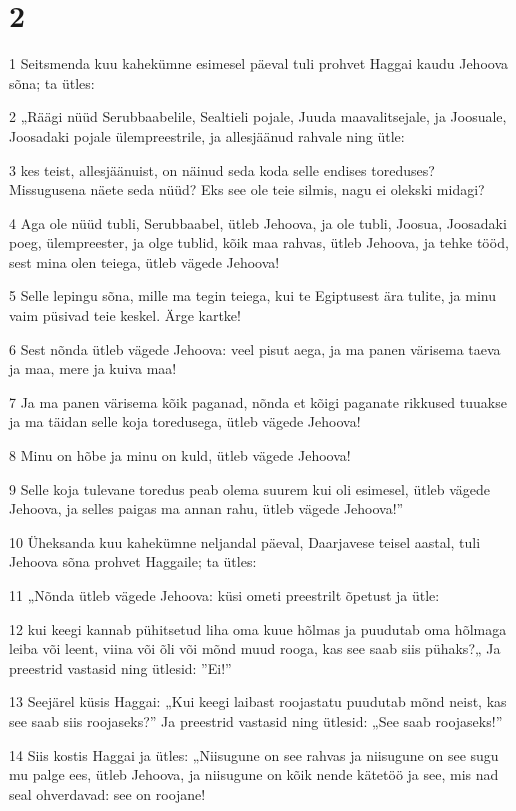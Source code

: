 \chapter{2}

\par 1 Seitsmenda kuu kahekümne esimesel päeval tuli prohvet Haggai kaudu Jehoova sõna; ta ütles:
\par 2 „Räägi nüüd Serubbaabelile, Sealtieli pojale, Juuda maavalitsejale, ja Joosuale, Joosadaki pojale ülempreestrile, ja allesjäänud rahvale ning ütle:
\par 3 kes teist, allesjäänuist, on näinud seda koda selle endises toreduses? Missugusena näete seda nüüd? Eks see ole teie silmis, nagu ei olekski midagi?
\par 4 Aga ole nüüd tubli, Serubbaabel, ütleb Jehoova, ja ole tubli, Joosua, Joosadaki poeg, ülempreester, ja olge tublid, kõik maa rahvas, ütleb Jehoova, ja tehke tööd, sest mina olen teiega, ütleb vägede Jehoova!
\par 5 Selle lepingu sõna, mille ma tegin teiega, kui te Egiptusest ära tulite, ja minu vaim püsivad teie keskel. Ärge kartke!
\par 6 Sest nõnda ütleb vägede Jehoova: veel pisut aega, ja ma panen värisema taeva ja maa, mere ja kuiva maa!
\par 7 Ja ma panen värisema kõik paganad, nõnda et kõigi paganate rikkused tuuakse ja ma täidan selle koja toredusega, ütleb vägede Jehoova!
\par 8 Minu on hõbe ja minu on kuld, ütleb vägede Jehoova!
\par 9 Selle koja tulevane toredus peab olema suurem kui oli esimesel, ütleb vägede Jehoova, ja selles paigas ma annan rahu, ütleb vägede Jehoova!”
\par 10 Üheksanda kuu kahekümne neljandal päeval, Daarjavese teisel aastal, tuli Jehoova sõna prohvet Haggaile; ta ütles:
\par 11 „Nõnda ütleb vägede Jehoova: küsi ometi preestrilt õpetust ja ütle:
\par 12 kui keegi kannab pühitsetud liha oma kuue hõlmas ja puudutab oma hõlmaga leiba või leent, viina või õli või mõnd muud rooga, kas see saab siis pühaks?„ Ja preestrid vastasid ning ütlesid: ”Ei!”
\par 13 Seejärel küsis Haggai: „Kui keegi laibast roojastatu puudutab mõnd neist, kas see saab siis roojaseks?” Ja preestrid vastasid ning ütlesid: „See saab roojaseks!”
\par 14 Siis kostis Haggai ja ütles: „Niisugune on see rahvas ja niisugune on see sugu mu palge ees, ütleb Jehoova, ja niisugune on kõik nende kätetöö ja see, mis nad seal ohverdavad: see on roojane!

